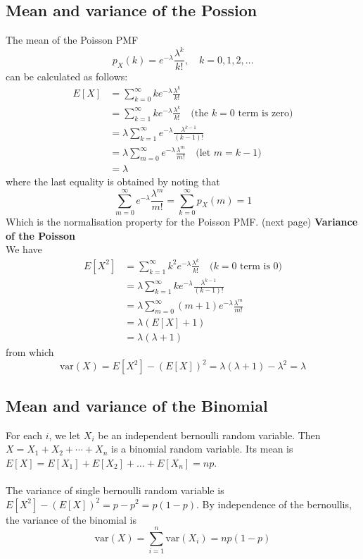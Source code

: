 \documentclass{report}
\begin{document}
\subsection{Mean and variance of the Possion}
The mean of the Poisson PMF
\begin{equation*}
p_X(k)=e^{-\lambda}\frac{\lambda^k}{k!},\quad k=0,1,2,\ldots
\end{equation*}
can be calculated as follows:
\begin{align*}
E[X]&=\sum^\infty_{k=0}ke^{-\lambda}\frac{\lambda^k}{k!}\\
&=\sum^\infty_{k=1}ke^{-\lambda}\frac{\lambda^k}{k!}\quad\text{(the $k=0$ term is zero)}\\
&=\lambda\sum^\infty_{k=1}e^{-\lambda}\frac{\lambda^{k-1}}{(k-1)!}\\
&=\lambda\sum^\infty_{m=0}e^{-\lambda}\frac{\lambda^{m}}{m!}\quad\text{(let $m=k-1$)}\\
&=\lambda
\end{align*}
where the last equality is obtained by noting that
\begin{equation*}
\sum^\infty_{m=0}e^{-\lambda}\frac{\lambda^{m}}{m!}=\sum^\infty_{k=0}p_X(m)=1
\end{equation*}
Which is the normalisation property for the Poisson PMF.
(next page)\newpage
\noindent\textbf{Variance of the Poisson}\\
We have
\begin{align*}
E[X^2]&=\sum^{\infty}_{k=1}k^2e^{-\lambda}\frac{\lambda^k}{k!}\quad\text{($k=0$ term is 0)}\\
&=\lambda\sum^{\infty}_{k=1}ke^{-\lambda}\frac{\lambda^{k-1}}{(k-1)!}\\
&=\lambda\sum^{\infty}_{m=0}(m+1)e^{-\lambda}\frac{\lambda^{m}}{m!}\\
&=\lambda(E[X]+1)\\
&=\lambda(\lambda+1)
\end{align*}
from which
\begin{equation*}
\text{var}(X)=E[X^2]-(E[X])^2=\lambda(\lambda+1)-\lambda^2=\lambda
\end{equation*}

\subsection{Mean and variance of the Binomial}
For each $i$, we let $X_i$ be an independent bernoulli random variable. Then $X=X_1+X_2+\cdots+X_n$ is a binomial random variable. Its mean is $E[X]=E[X_1]+E[X_2]+\ldots+E[X_n]=np$.\\
\vspace{1mm}\\
The variance of single bernoulli random variable is $E[X^2]-(E[X])^2=p-p^2=p(1-p)$. By independence of the bernoullis, the variance of the binomial is
\begin{equation*}
\text{var}(X)=\sum^n_{i=1}\text{var}(X_i)=np(1-p)
\end{equation*}
\newpage
\end{document}
